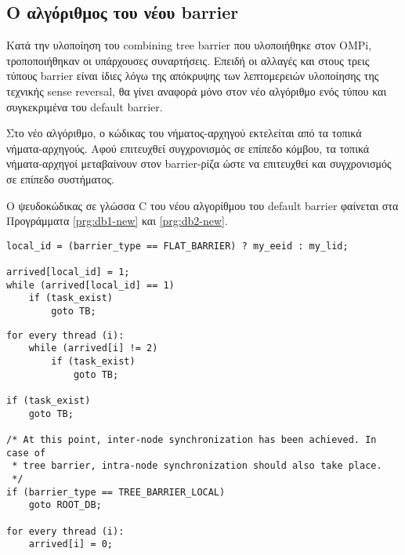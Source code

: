 \subsection{Ο αλγόριθμος του νέου barrier}
Κατά την υλοποίηση του combining tree barrier που υλοποιήθηκε στον OMPi, τροποποιήθηκαν οι υπάρχουσες συναρτήσεις. Επειδή οι αλλαγές και στους τρεις τύπους barrier είναι ίδιες λόγω της απόκρυψης των λεπτομερειών υλοποίησης της τεχνικής sense reversal, θα γίνει αναφορά μόνο στον νέο αλγόριθμο ενός τύπου και συγκεκριμένα του default barrier.

Στο νέο αλγόριθμο, ο κώδικας του νήματος-αρχηγού εκτελείται από τα τοπικά νήματα-αρχηγούς. Αφού επιτευχθεί συγχρονισμός σε επίπεδο κόμβου, τα τοπικά νήματα-αρχηγοί μεταβαίνουν στον barrier-ρίζα ώστε να επιτευχθεί και συγχρονισμός σε επίπεδο συστήματος.

Ο ψευδοκώδικας σε γλώσσα C του νέου αλγορίθμου του default barrier φαίνεται στα Προγράμματα \ref{prg:db1-new} και \ref{prg:db2-new}.

\begin{lstlisting}[label=prg:db1-new, caption=Ο νέος default barrier για όλα τα νήματα πλην των τοπικών νημάτων-αρχηγών.]
local_id = (barrier_type == FLAT_BARRIER) ? my_eeid : my_lid;

arrived[local_id] = 1;
while (arrived[local_id] == 1)
    if (task_exist)
        goto TB;
\end{lstlisting}

\newpage

\begin{lstlisting}[label=prg:db2-new, caption=Ο νέος default barrier για τα τοπικά νήματα-αρχηγούς.]
for every thread (i):
    while (arrived[i] != 2)
        if (task_exist)
            goto TB;

if (task_exist)
    goto TB;

/* At this point, inter-node synchronization has been achieved. In case of
 * tree barrier, intra-node synchronization should also take place.
 */
if (barrier_type == TREE_BARRIER_LOCAL)
    goto ROOT_DB;

for every thread (i):
    arrived[i] = 0;
\end{lstlisting}

